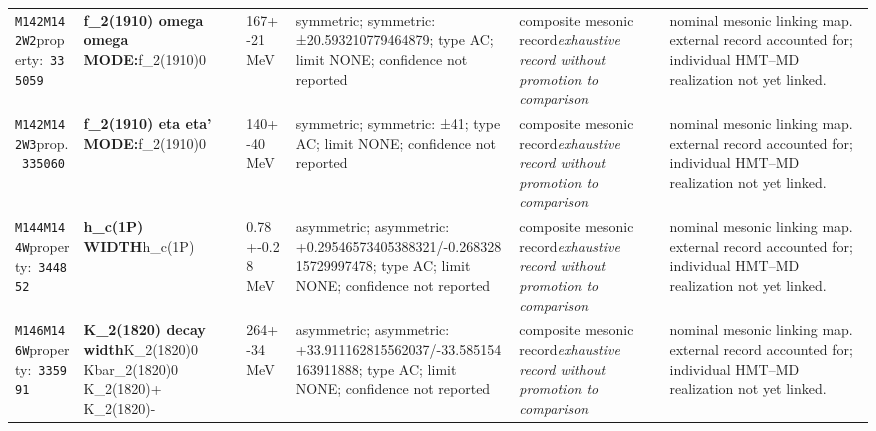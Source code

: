 \begin{landscape}
\begin{longtable}{L{1.85cm}L{4.45cm}L{2.35cm}L{4.05cm}L{3.35cm}L{7.15cm}}
\texttt{M142}\newline \texttt{M142W2}\newline property:\ \texttt{335059} & \textbf{f\_\allowbreak{}2(1910) omega omega MODE:}\newline f\_\allowbreak{}2(1910)0 & 167+-21\,MeV & symmetric; symmetric: ±20.593210779464879; type AC; limit NONE; confidence not reported & composite mesonic record\newline \emph{exhaustive record without promotion to comparison} & nominal mesonic linking map. external record accounted for; individual HMT--MD realization not yet linked. \\
\texttt{M142}\newline \texttt{M142W3}\newline prop.\ \texttt{335060} & \textbf{f\_\allowbreak{}2(1910) eta eta' MODE:}\newline f\_\allowbreak{}2(1910)0 & 140+-40\,MeV & symmetric; symmetric: ±41; type AC; limit NONE; confidence not reported & composite mesonic record\newline \emph{exhaustive record without promotion to comparison} & nominal mesonic linking map. external record accounted for; individual HMT--MD realization not yet linked. \\
\texttt{M144}\newline \texttt{M144W}\newline property:\ \texttt{344852} & \textbf{h\_\allowbreak{}c(1P) WIDTH}\newline h\_\allowbreak{}c(1P) & 0.78+-0.28\,MeV & asymmetric; asymmetric: +0.29546573405388321/-0.26832815729997478; type AC; limit NONE; confidence not reported & composite mesonic record\newline \emph{exhaustive record without promotion to comparison} & nominal mesonic linking map. external record accounted for; individual HMT--MD realization not yet linked. \\
\texttt{M146}\newline \texttt{M146W}\newline property:\ \texttt{335991} & \textbf{K\_\allowbreak{}2(1820) decay width}\newline K\_\allowbreak{}2(1820)0 \textbar{}\allowbreak{} Kbar\_\allowbreak{}2(1820)0 \textbar{}\allowbreak{} K\_\allowbreak{}2(1820)+ \textbar{}\allowbreak{} K\_\allowbreak{}2(1820)- & 264+-34\,MeV & asymmetric; asymmetric: +33.911162815562037/-33.585154163911888; type AC; limit NONE; confidence not reported & composite mesonic record\newline \emph{exhaustive record without promotion to comparison} & nominal mesonic linking map. external record accounted for; individual HMT--MD realization not yet linked. \\

\end{longtable}
\end{landscape}
